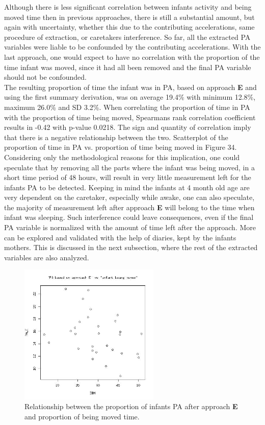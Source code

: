 \documentclass{article}
\begin{document}
{Although there is less significant correlation between infants activity and being moved time then in previous approaches, there is still a substantial amount, but again with uncertainty, whether this due to the contributing accelerations, same procedure of extraction, or caretakers interference. So far, all the extracted PA variables were liable to be confounded by the contributing accelerations. With the last approach, one would expect to have no correlation with the proportion of the time infant was moved, since it had all been removed and the final PA variable should not be confounded. \\
The resulting proportion of time the infant was in PA, based on approach \textbf{E} and using the first summary derivation, was on average 19.4\% with minimum 12.8\%, maximum 26.0\% and SD 3.2\%. When correlating the proportion of time in PA with the proportion of time being moved, Spearmans rank correlation coefficient results in -0.42 with p-value 0.0218. The sign and quantity of correlation imply that there is a negative relationship between the two. Scatterplot of the proportion of time in PA vs. proportion of time being moved in Figure 34. Considering only the methodological reasons for this implication, one could speculate that by removing all the parts where the infant was being moved, in a short time period of 48 hours, will result in very little measurement left for the infants PA to be detected. Keeping in mind the infants at 4 month old age are very dependent on the caretaker, especially while awake, one can also speculate, the majority of measurement left after approach \textbf{E} will belong to the time when infant was sleeping. Such interference could leave consequences, even if the final PA variable is normalized with the amount of time left after the approach. More can be explored and validated with the help of diaries, kept by the infants mothers. This is discussed in the next subsection, where the rest of the extracted variables are also analyzed. 
 \begin{figure}[h!]
\includegraphics[width=6.7cm, height=6.7cm]{scatterplotPAEIBM.jpg}
\caption{Relationship between the proportion of infants PA after approach \textbf{E} and proportion of being moved time.}
\end{figure}
\\

}
\end{document}
